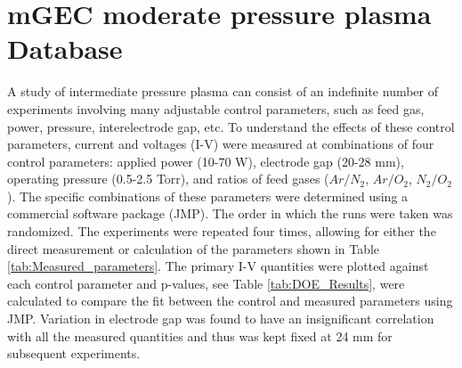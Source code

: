 \documentclass[12pt]{iopart}
\begin{document}
\section{mGEC moderate pressure plasma Database}\label{Sect:Database}

A study of intermediate pressure plasma can consist of an indefinite number of experiments involving many adjustable control parameters, such as feed gas, power, pressure, interelectrode gap, etc. To understand the effects of these control parameters, current and voltages (I-V) were measured at combinations of four control parameters: applied power (10-70 W), electrode gap (20-28 mm), operating pressure (0.5-2.5 Torr), and ratios of feed gases ($Ar/N_2$, $Ar/O_2$, $N_2/O_2$). The specific combinations of these parameters were determined using a commercial software package (JMP). The order in which the runs were taken was randomized. The experiments were repeated four times, allowing for either the direct measurement or calculation of the parameters shown in Table \ref{tab:Measured_parameters}. The primary I-V quantities were plotted against each control parameter and p-values, see Table \ref{tab:DOE_Results}, were calculated to compare the fit between the control and measured parameters using JMP. Variation in electrode gap was found to have an insignificant correlation with all the measured quantities and thus was kept fixed at 24 mm for subsequent experiments.  
\end{document}

